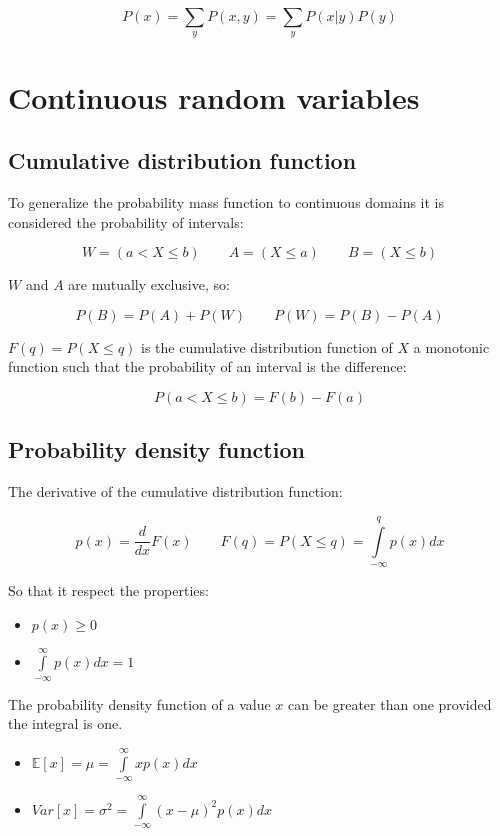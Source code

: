 	$$P(x) = \sum\limits_yP(x,y) = \sum\limits_yP(x|y)P(y)$$

\section{Continuous random variables}

	\subsection{Cumulative distribution function}
	To generalize the probability mass function to continuous domains it is considered the probability of intervals:

	$$W = (a < X \le b) \qquad A = (X \le a)\qquad B = (X\le b)$$

	$W$ and $A$ are mutually exclusive, so:

	$$P(B) = P(A) + P(W) \qquad P(W) = P(B) - P(A)$$

	$F(q) = P(X\le q)$ is the cumulative distribution function of $X$ a monotonic function such that the probability of an interval is the difference:

	$$P(a < X \le b) = F(b) - F(a)$$

	\subsection{Probability density function}
	The derivative of the cumulative distribution function:

	$$p(x) = \frac{d}{dx}F(x)\qquad F(q) = P(X\le q) = \int\limits_{-\infty}^q p(x)dx$$

	So that it respect the properties:

	\begin{multicols}{2}
		\begin{itemize}
			\item $p(x) \ge 0$
			\item $\int\limits_{-\infty}^\infty p(x)dx = 1$
		\end{itemize}
	\end{multicols}

	The probability density function of a value $x$ can be greater than one provided the integral is one.

	\begin{multicols}{2}
		\begin{itemize}
			\item $\mathbb{E}[x] = \mu = \int\limits_{-\infty}^\infty xp(x)dx$
			\item $Var[x] = \sigma^2 = \int\limits_{-\infty}^\infty (x-\mu)^2p(x)dx$
		\end{itemize}
	\end{multicols}

